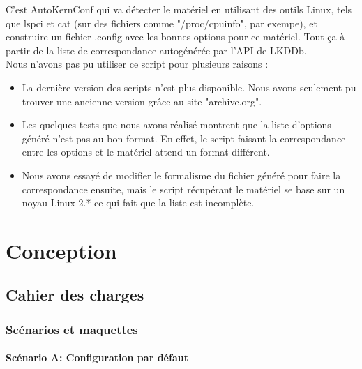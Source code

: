\documentclass[16pts]{report}
\begin{document}
    C'est AutoKernConf qui va détecter le matériel en utilisant des outils Linux, 
    tels que lspci et cat (sur des fichiers comme "/proc/cpuinfo", par exempe), 
    et construire un fichier .config avec les bonnes 
    options pour ce matériel. Tout ça à partir de la liste de correspondance 
    autogénérée par l'API de LKDDb. \\

    Nous n'avons pas pu utiliser ce script pour plusieurs raisons :
    \begin{itemize}
        \item La dernière version des scripts n'est plus disponible. Nous avons 
        seulement pu trouver une ancienne version grâce au site "archive.org".
        \item Les quelques tests que nous avons réalisé montrent que la 
        liste d'options généré n'est pas au bon format. En effet, le script 
        faisant la correspondance entre les options et le matériel attend 
        un format différent.
        \item Nous avons essayé de modifier le formalisme du fichier généré 
        pour faire la correspondance ensuite, mais le script récupérant le 
        matériel se base sur un noyau Linux 2.* ce qui fait que la liste est 
        incomplète.
    \end{itemize}

\chapter{Conception}
\label{cha:Conception}
    \section{Cahier des charges}
    \label{sec:Cahier des charges}
        \subsection{Scénarios et maquettes}
        \label{sub:Scénarios et maquettes}

\subsubsection{Scénario A: Configuration par défaut}
\label{sssub:Scénario A: Configuration par défaut}
\end{document}
